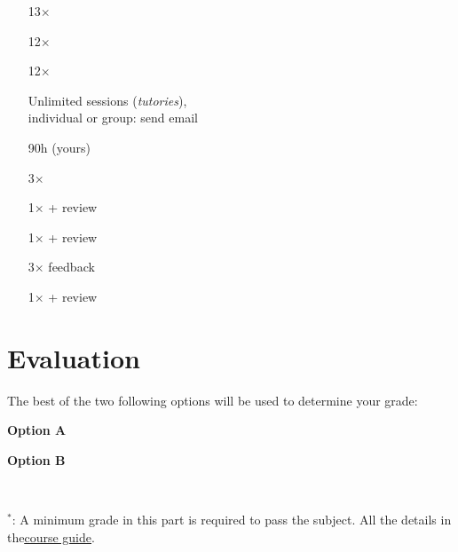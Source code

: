 \begin{center}
\begin{minipage}{0.5\linewidth}
\begin{itemize}
\item[13$\times$] 
\item[12$\times$] 
\item[12$\times$] 
\item[Unlimited] \textbf{} sessions (\textit{tutories}),\\individual or group: send email
\item[90h] \textbf{} (yours)
\vspace{0.2cm}
\item [3$\times$] 
\item [1$\times$]  + review
\item [1$\times$]  + review
\vspace{0.2cm}
\item [3$\times$]  feedback
\item [1$\times$]  + review
\end{itemize}
\end{minipage}
\end{center}

\section*{Evaluation}
The best of the two following options will be used to determine your grade:\\
\noindent\begin{minipage}{0.48\linewidth}
\raggedright
\textbf{Option A}\\[0.15cm]
\end{minipage}%
\hfill
\begin{minipage}{0.36\linewidth} %
\raggedleft
\textbf{Option B}\\[0.15cm]
\end{minipage}
\\[0.1cm]
\begin{center}
{\small $^{*}$: A minimum grade in this part is required to pass the subject. All the details in the\pdfbreak \href{https://apps.uab.cat/guies/public/html/2026/assignatura/104353/en}{\underline{course guide}}.}\\[0.1cm]
\end{center}
